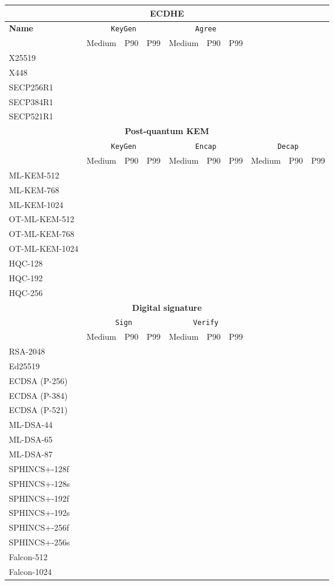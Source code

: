 \documentclass[letterpaper,12pt,titlepage,oneside,final]{book}
\begin{document}
\begin{table}[p]
\begin{tabular}{lrrrrrrrrr}
\toprule
\multicolumn{10}{c}{\textbf{ECDHE}} \\
\midrule
\textbf{Name} & \multicolumn{3}{c}{\texttt{KeyGen}} & \multicolumn{3}{c}{\texttt{Agree}} \\
\cmidrule(lr){2-4}
\cmidrule(lr){5-7}
& Medium & P90 & P99 & Medium & P90 & P99 \\
\midrule
X25519 \\
X448 \\
SECP256R1 \\
SECP384R1 \\
SECP521R1 \\
\midrule
\multicolumn{10}{c}{\textbf{Post-quantum KEM}} \\
\midrule
    & \multicolumn{3}{c}{\texttt{KeyGen}} 
    & \multicolumn{3}{c}{\texttt{Encap}} 
    & \multicolumn{3}{c}{\texttt{Decap}} \\
\cmidrule(lr){2-4}
\cmidrule(lr){5-7}
\cmidrule(lr){8-10}
    & Medium & P90 & P99 
    & Medium & P90 & P99 
    & Medium & P90 & P99 \\
\midrule
ML-KEM-512 \\
ML-KEM-768 \\
ML-KEM-1024 \\
OT-ML-KEM-512 \\
OT-ML-KEM-768 \\
OT-ML-KEM-1024 \\
HQC-128 \\
HQC-192 \\
HQC-256 \\
\midrule
\multicolumn{10}{c}{\textbf{Digital signature}} \\
\midrule
& \multicolumn{3}{c}{\texttt{Sign}} & \multicolumn{3}{c}{\texttt{Verify}} \\
\cmidrule(lr){2-4}
\cmidrule(lr){5-7}
& Medium & P90 & P99 & Medium & P90 & P99 \\
\midrule
RSA-2048 \\
Ed25519 \\
ECDSA (P-256) \\
ECDSA (P-384) \\
ECDSA (P-521) \\
ML-DSA-44 \\
ML-DSA-65 \\
ML-DSA-87 \\
SPHINCS+-128f \\
SPHINCS+-128s \\
SPHINCS+-192f \\
SPHINCS+-192s \\
SPHINCS+-256f \\
SPHINCS+-256s \\
Falcon-512 \\
Falcon-1024 \\
\bottomrule
\end{tabular}
\end{table}
\end{document}

